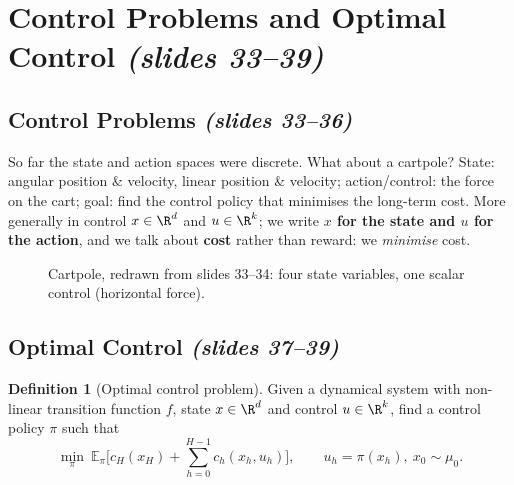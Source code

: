 \documentclass[11pt,a4paper]{article}
\newcommand{\E}{\mathbb{E}}
\newcommand{\slides}[1]{\emph{(slides #1)}}
\theoremstyle{plain}
\theoremstyle{definition}
\newtheorem{definition}[theorem]{Definition}
\theoremstyle{remark}
\begin{document}
\section{Control Problems and Optimal Control \slides{33--39}}

\subsection{Control Problems \slides{33--36}}

So far the state and action spaces were discrete. What about a cartpole? State: angular position \& velocity, linear position \& velocity; action/control: the force on the cart; goal: find the control policy that minimises the long-term cost. More generally in control $x\in\R^d$ and $u\in\R^k$; we write \textbf{$x$ for the state and $u$ for the action}, and we talk about \textbf{cost} rather than reward: we \emph{minimise} cost.

\begin{figure}[H]
\centering
{}
\caption{Cartpole, redrawn from slides 33--34: four state variables, one scalar control (horizontal force).}
\end{figure}

\subsection{Optimal Control \slides{37--39}}

\begin{definition}[Optimal control problem]
Given a dynamical system with non-linear transition function $f$, state $x\in\R^d$ and control $u\in\R^k$, find a control policy $\pi$ such that
\[
\min_\pi\ \E_\pi\Big[c_H(x_H)+\sum_{h=0}^{H-1}c_h(x_h,u_h)\Big],\qquad u_h=\pi(x_h),\ x_0\sim\mu_0 .
\]
\end{definition}
\end{document}
